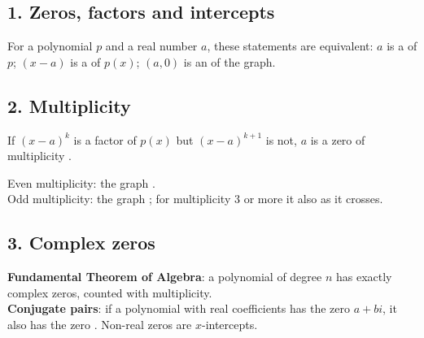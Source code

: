 \subsection*{1. Zeros, factors and intercepts}
\begin{keyidea}
For a polynomial $p$ and a real number $a$, these statements are equivalent: $a$ is a  of $p$; $(x-a)$ is a  of $p(x)$; $(a,0)$ is an  of the graph.
\end{keyidea}

\subsection*{2. Multiplicity}
If $(x-a)^k$ is a factor of $p(x)$ but $(x-a)^{k+1}$ is not, $a$ is a zero of multiplicity .
\begin{keyidea}
Even multiplicity: the graph .\\
Odd multiplicity: the graph ; for multiplicity $3$ or more it also  as it crosses.
\end{keyidea}
\begin{center}
\end{center}

\subsection*{3. Complex zeros}
\begin{keyidea}
\textbf{Fundamental Theorem of Algebra}: a polynomial of degree $n$ has exactly  complex zeros, counted with multiplicity.\\
\textbf{Conjugate pairs}: if a polynomial with real coefficients has the zero $a+bi$, it also has the zero . Non-real zeros are  $x$-intercepts.
\end{keyidea}

